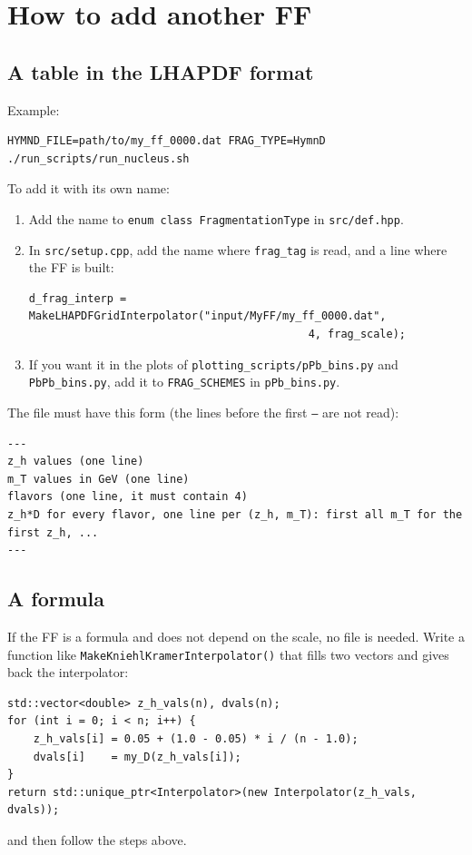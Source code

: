 \documentclass{article}
\begin{document}
\section{How to add another FF}\label{sec:own}

\subsection{A table in the LHAPDF format}

Example:
\begin{verbatim}
HYMND_FILE=path/to/my_ff_0000.dat FRAG_TYPE=HymnD ./run_scripts/run_nucleus.sh
\end{verbatim}


To add it with its own name:
\begin{enumerate}
\item Add the name to \texttt{enum class FragmentationType} in
  \texttt{src/def.hpp}.
\item In \texttt{src/setup.cpp}, add the name
  where \texttt{frag\_tag} is read, and a line where the FF is built:
\begin{verbatim}
d_frag_interp = MakeLHAPDFGridInterpolator("input/MyFF/my_ff_0000.dat",
                                           4, frag_scale);
\end{verbatim}
\item If you want it in the plots of \texttt{plotting\_scripts/pPb\_bins.py} and
  \texttt{PbPb\_bins.py}, add it to \texttt{FRAG\_SCHEMES} in \texttt{pPb\_bins.py}.
\end{enumerate}
The file must have this form (the lines before the first \texttt{---} are
not read):
\begin{verbatim}
---
z_h values (one line)
m_T values in GeV (one line)
flavors (one line, it must contain 4)
z_h*D for every flavor, one line per (z_h, m_T): first all m_T for the first z_h, ...
---
\end{verbatim}

\subsection{A formula}

If the FF is a formula and does not depend on the scale, no file is needed.
Write a function like \texttt{MakeKniehlKramerInterpolator()} that fills two
vectors and gives back the interpolator:
\begin{verbatim}
std::vector<double> z_h_vals(n), dvals(n);
for (int i = 0; i < n; i++) {
    z_h_vals[i] = 0.05 + (1.0 - 0.05) * i / (n - 1.0);
    dvals[i]    = my_D(z_h_vals[i]);
}
return std::unique_ptr<Interpolator>(new Interpolator(z_h_vals, dvals));
\end{verbatim}
and then follow the steps above.
\end{document}
